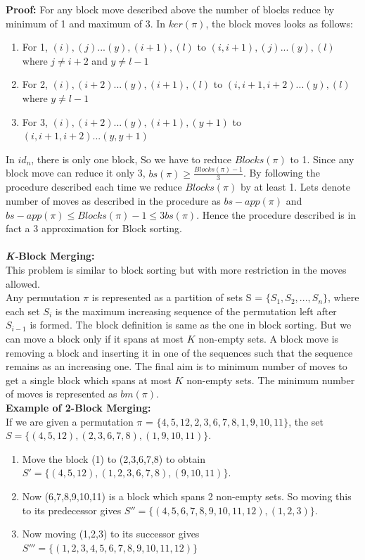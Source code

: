 \documentclass[BTech]{iitmdiss}
\begin{document}
\textbf{Proof:}
For any block move described above the number of blocks reduce by minimum of 1 and maximum of 3. In $ker(\pi)$, the block moves looks as follows:
\begin{enumerate}
    \item For 1, $(i),(j)...(y),(i+1),(l)$ to $(i,i+1),(j)...(y),(l)$ where $j \neq i+2$ and $y \neq l-1$
    \item For 2, $(i),(i+2)...(y),(i+1),(l)$ to $(i,i+1,i+2)...(y),(l)$ where $y \neq l-1$
    \item For 3, $(i),(i+2)...(y),(i+1),(y+1)$ to $(i,i+1,i+2)...(y,y+1)$
\end{enumerate}
In $id_n$, there is only one block, So we have to reduce $Blocks(\pi)$ to 1. Since any block move can reduce it only 3, $bs(\pi) \geq \frac{Blocks(\pi) - 1}{3}$. By following the procedure described each time we reduce $Blocks(\pi)$ by at least 1. Lets denote number of moves as described in the procedure as $bs-app(\pi)$ and $bs-app(\pi) \leq Blocks(\pi)-1 \leq 3bs(\pi)$. Hence the procedure described is in fact a 3 approximation for Block sorting.\\~\\
\noindent
\textbf{\textit{K-}Block Merging:}\\
This problem is similar to block sorting but with more restriction in the moves allowed.\\
Any permutation $\pi$ is represented as a partition of sets S = $\{S_1,S_2,...,S_n\}$, where each set $S_i$ is the maximum increasing sequence of the permutation left after $S_{i-1}$ is formed. The block definition is same as the one in block sorting. But we can move a block only if it spans at most $K$ non-empty sets. A block move is removing a block and inserting it in one of the sequences such that the sequence remains as an increasing one.  The final aim is to minimum number of moves to get a single block which spans at most $K$ non-empty sets. The minimum number of moves is represented as $bm(\pi)$.\\
\textbf{Example of 2-Block Merging:}\\
If we are given a permutation $\pi$ = $\{4,5,12,2,3,6,7,8,1,9,10,11\}$, the set $S = \{(4,5,12),(2,3,6,7,8),(1,9,10,11)\}.$
\begin{enumerate}
    \item Move the block (1) to (2,3,6,7,8) to obtain $S' = \{(4,5,12),(1,2,3,6,7,8),(9,10,11)\}.$ 
    \item Now (6,7,8,9,10,11) is a block which spans 2 non-empty sets. So moving this to its predecessor gives $S'' = \{(4,5,6,7,8,9,10,11,12),(1,2,3)\}.$ 
    \item Now moving (1,2,3) to its successor gives $S''' = \{(1,2,3,4,5,6,7,8,9,10,11,12)\}$
\end{enumerate}
\end{document}
